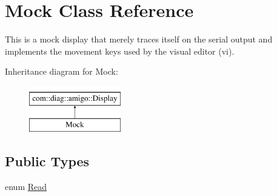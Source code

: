 \hypertarget{classMock}{
\section{Mock Class Reference}
\label{classMock}
}


This is a mock display that merely traces itself on the serial output and implements the movement keys used by the visual editor (vi).  


Inheritance diagram for Mock:\begin{figure}[H]
\begin{center}
\leavevmode
\includegraphics[height=2cm]{classMock}
\end{center}
\end{figure}
\subsection*{Public Types}
\begin{DoxyCompactItemize}
\item 
enum \hyperlink{structcom_1_1diag_1_1amigo_1_1Display_a57e9915682f8aeb77066171c97c58288}{Read} 
\end{DoxyCompactItemize}
